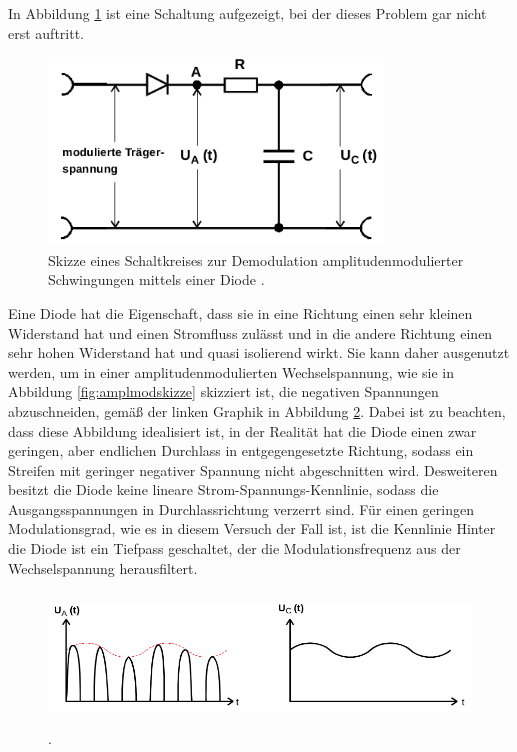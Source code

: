 In Abbildung \ref{fig:ampldemodschaltung2} ist eine Schaltung aufgezeigt, bei der dieses Problem gar nicht erst auftritt.

\begin{figure}
  \centering
  \includegraphics[height=5cm]{JasperErsterSchultag/ampldemodschaltung2.png}
  \caption{Skizze eines Schaltkreises zur Demodulation amplitudenmodulierter Schwingungen mittels einer Diode \cite{anleitung}.}
  \label{fig:ampldemodschaltung2}
\end{figure}

Eine Diode hat die Eigenschaft, dass sie in eine Richtung einen sehr kleinen Widerstand hat und einen Stromfluss zulässt und in die
andere Richtung einen sehr hohen Widerstand hat und quasi isolierend wirkt. Sie kann daher ausgenutzt werden, um in einer amplitudenmodulierten
Wechselspannung, wie sie in Abbildung \ref{fig:amplmodskizze} skizziert ist, die negativen Spannungen abzuschneiden, gemäß der linken Graphik in
Abbildung \ref{fig:diodetiefpass}. Dabei ist zu beachten, dass diese Abbildung idealisiert ist, in der Realität hat die Diode einen zwar geringen, aber
endlichen Durchlass in entgegengesetzte Richtung, sodass ein Streifen mit geringer negativer Spannung nicht abgeschnitten wird.
Desweiteren besitzt die Diode keine lineare Strom-Spannungs-Kennlinie, sodass die Ausgangsspannungen in Durchlassrichtung verzerrt sind.
Für einen geringen Modulationsgrad, wie es in diesem Versuch der Fall ist, ist die Kennlinie
Hinter die Diode ist ein Tiefpass geschaltet, der die Modulationsfrequenz aus der Wechselspannung herausfiltert.

\begin{figure}
  \centering
  \includegraphics[height=3.5cm]{JasperErsterSchultag/diodetiefpass.png}
  \caption{\cite{anleitung}.}
  \label{fig:diodetiefpass}
\end{figure}


